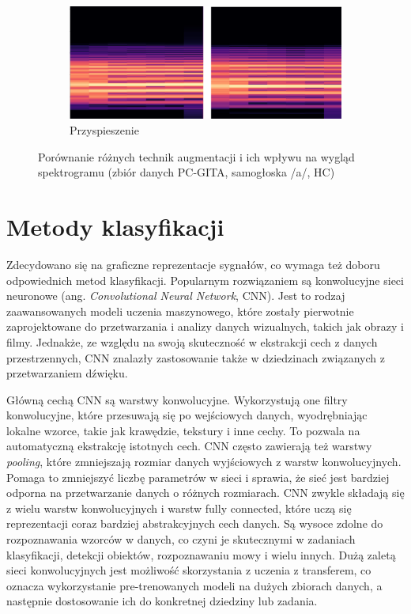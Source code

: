\begin{figure}[ht]
    \begin{subfigure}{0.7\textwidth}
        \includegraphics[width=\linewidth]{./img/augmentation/speed}
        \caption{Przyspieszenie\@}
        \label{fig:speed}
    \end{subfigure}

    \caption{Porównanie różnych technik augmentacji i ich wpływu na wygląd spektrogramu (zbiór danych PC-GITA, samogłoska /a/, HC)}
    \label{fig:augumentacja}
\end{figure}

\newpage
\section{Metody klasyfikacji}
\label{sec:klasyfikacja}

Zdecydowano się na graficzne reprezentacje sygnałów, co wymaga też doboru odpowiednich metod klasyfikacji.
Popularnym rozwiązaniem są konwolucyjne sieci neuronowe (ang. \emph{Convolutional Neural Network}, CNN).
Jest to rodzaj zaawansowanych modeli uczenia maszynowego, które zostały pierwotnie zaprojektowane do przetwarzania i analizy danych wizualnych, takich jak obrazy i filmy.
Jednakże, ze względu na swoją skuteczność w ekstrakcji cech z danych przestrzennych, CNN znalazły zastosowanie także w dziedzinach związanych z przetwarzaniem dźwięku.

Główną cechą CNN są warstwy konwolucyjne.
Wykorzystują one filtry konwolucyjne, które przesuwają się po wejściowych danych, wyodrębniając lokalne wzorce, takie jak krawędzie, tekstury i inne cechy.
To pozwala na automatyczną ekstrakcję istotnych cech.
CNN często zawierają też warstwy \emph{pooling}, które zmniejszają rozmiar danych wyjściowych z warstw konwolucyjnych.
Pomaga to zmniejszyć liczbę parametrów w sieci i sprawia, że sieć jest bardziej odporna na przetwarzanie danych o różnych rozmiarach.
CNN zwykle składają się z wielu warstw konwolucyjnych i warstw fully connected, które uczą się reprezentacji coraz bardziej abstrakcyjnych cech danych.
Są wysoce zdolne do rozpoznawania wzorców w danych, co czyni je skutecznymi w zadaniach klasyfikacji, detekcji obiektów, rozpoznawaniu mowy i wielu innych.
Dużą zaletą sieci konwolucyjnych jest możliwość skorzystania z uczenia z transferem, co oznacza wykorzystanie pre-trenowanych modeli na dużych zbiorach danych, a następnie dostosowanie ich do konkretnej dziedziny lub zadania.

